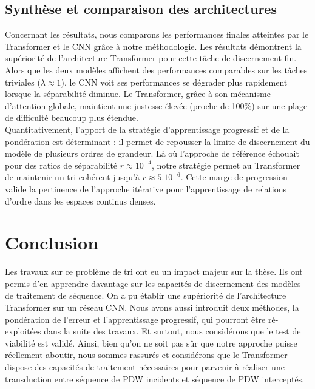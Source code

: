 \subsection{Synthèse et comparaison des architectures}
Concernant les résultats, nous comparons les performances finales atteintes par le Transformer et le CNN grâce à notre méthodologie. Les résultats démontrent la supériorité de l'architecture Transformer pour cette tâche de discernement fin. Alors que les deux modèles affichent des performances comparables sur les tâches triviales ($\lambda \approx 1$), le CNN voit ses performances se dégrader plus rapidement lorsque la séparabilité diminue. Le Transformer, grâce à son mécanisme d'attention globale, maintient une justesse élevée (proche de 100\%) sur une plage de difficulté beaucoup plus étendue.\\

Quantitativement, l'apport de la stratégie d'apprentissage progressif et de la pondération est déterminant : il permet de repousser la limite de discernement du modèle de plusieurs ordres de grandeur. Là où l'approche de référence échouait pour des ratios de séparabilité $r \approx 10^{-4}$, notre stratégie permet au Transformer de maintenir un tri cohérent jusqu'à $r \approx 5.10^{-6}$. Cette marge de progression valide la pertinence de l'approche itérative pour l'apprentissage de relations d'ordre dans les espaces continus denses.

\section{Conclusion}
Les travaux sur ce problème de tri ont eu un impact majeur sur la thèse. Ils ont permis d'en apprendre davantage sur les capacités de discernement des modèles de traitement de séquence. On a pu établir une supériorité de l'architecture Transformer sur un réseau CNN. Nous avons aussi introduit deux méthodes, la pondération de l'erreur et l'apprentissage progressif, qui pourront être ré-exploitées dans la suite des travaux. Et surtout, nous considérons que le test de viabilité est validé. Ainsi, bien qu'on ne soit pas sûr que notre approche puisse réellement aboutir, nous sommes rassurés et considérons que le Transformer dispose des capacités de traitement nécessaires pour parvenir à réaliser une transduction entre séquence de PDW incidents et séquence de PDW interceptés.